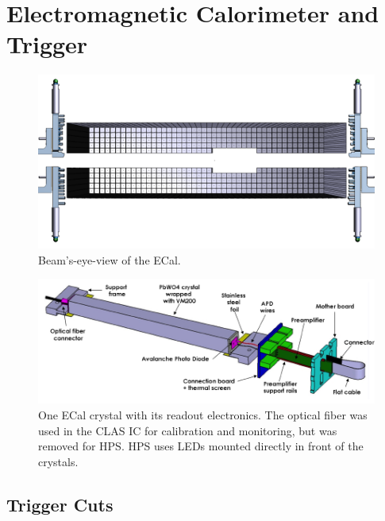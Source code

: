 \section{Electromagnetic Calorimeter and Trigger}
\begin{figure}[ht]
    \includegraphics[width=\textwidth]{detector/figs/ECal}
    \caption{Beam's-eye-view of the ECal.}
    \label{fig:ecal}
\end{figure}

\begin{figure}[ht]
    \includegraphics[width=\textwidth]{detector/figs/ecal_module}
    \caption{One ECal crystal with its readout electronics. The optical fiber was used in the CLAS IC for calibration and monitoring, but was removed for HPS. HPS uses LEDs mounted directly in front of the crystals.}
    \label{fig:ecal_module}
\end{figure}

\subsection{Trigger Cuts}
\label{sec:trigger_cuts}

